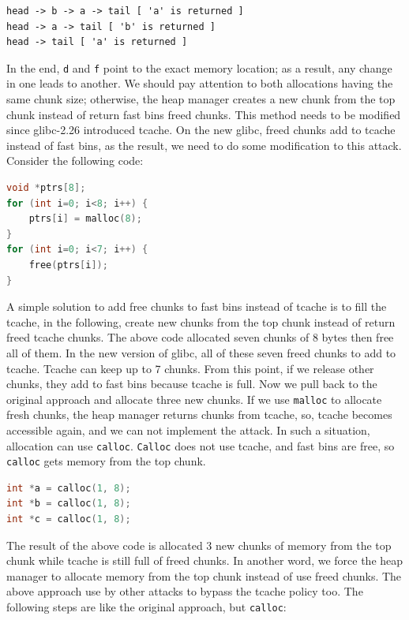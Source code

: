 \documentclass{masterthesis}
\newcommand*\libc{glibc}
\newcommand*\tch{tcache}
\newcommand*\fb{fast bins}
\newcommand*\Tch{Tcache\xspace}
\newcommand*\mallocc{\lstinline{malloc}}
\newcommand*\callocc{\lstinline{calloc}}
\newcommand*\Callocc{\lstinline{Calloc}\xspace}
\begin{document}
\begin{lstlisting}[frame=tlrb]
head -> b -> a -> tail [ 'a' is returned ]
head -> a -> tail [ 'b' is returned ]
head -> tail [ 'a' is returned ]
\end{lstlisting}

In the end, \lstinline{d} and \lstinline{f} point to the exact memory location; as a result, any change in one leads to another. We should pay attention to both allocations having the same chunk size; otherwise, the heap manager creates a new chunk from the top chunk instead of return \fb{} freed chunks.
This method needs to be modified since \libc{-2.26} introduced \tch{}. On the new \libc{}, freed chunks add to \tch{} instead of \fb{}, as the result, we need to do some modification to this attack. Consider the following code:

\begin{lstlisting}[language=c,frame=tlrb]
void *ptrs[8];
for (int i=0; i<8; i++) {
	ptrs[i] = malloc(8);
}
for (int i=0; i<7; i++) {
	free(ptrs[i]);
}
\end{lstlisting}

A simple solution to add free chunks to \fb{} instead of \tch{} is to fill the \tch{}, in the following, create new chunks from the top chunk instead of return freed \tch{} chunks. The above code allocated seven chunks of 8 bytes then free all of them. In the new version of \libc{}, all of these seven freed chunks to add to \tch{}. \Tch{} can keep up to 7 chunks. From this point, if we release other chunks, they add to \fb{} because \tch{} is full. Now we pull back to the original approach and allocate three new chunks. If we use \mallocc{} to allocate fresh chunks, the heap manager returns chunks from \tch{}, so, \tch{} becomes accessible again, and we can not implement the attack. In such a situation, allocation can use \callocc{}. \Callocc{} does not use \tch{}, and \fb{} are free, so \callocc{} gets memory from the top chunk.

\begin{lstlisting}[language=c,frame=tlrb]
int *a = calloc(1, 8);
int *b = calloc(1, 8);
int *c = calloc(1, 8);
\end{lstlisting}

The result of the above code is allocated 3 new chunks of memory from the top chunk while \tch{} is still full of freed chunks. In another word, we force the heap manager to allocate memory from the top chunk instead of use freed chunks. The above approach use by other attacks to bypass the \tch{} policy too. The following steps are like the original approach, but \callocc{}:
\end{document}

